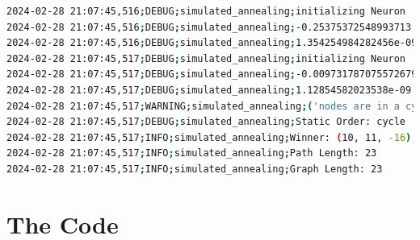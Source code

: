 \documentclass{article}
\begin{document}
\begin{lstlisting}[language=bash, caption=Example Output of Program]
2024-02-28 21:07:45,516;DEBUG;simulated_annealing;initializing Neuron
2024-02-28 21:07:45,516;DEBUG;simulated_annealing;-0.25375372548993713
2024-02-28 21:07:45,516;DEBUG;simulated_annealing;1.354254984282456e-09
2024-02-28 21:07:45,517;DEBUG;simulated_annealing;initializing Neuron
2024-02-28 21:07:45,517;DEBUG;simulated_annealing;-0.009731787075572679
2024-02-28 21:07:45,517;DEBUG;simulated_annealing;1.12854582023538e-09
2024-02-28 21:07:45,517;WARNING;simulated_annealing;('nodes are in a cycle', [(2, 1, -3), err=0.936, (2, 1, -3), err=0.936])
2024-02-28 21:07:45,517;DEBUG;simulated_annealing;Static Order: cycle
2024-02-28 21:07:45,517;INFO;simulated_annealing;Winner: (10, 11, -16), err=0.016
2024-02-28 21:07:45,517;INFO;simulated_annealing;Path Length: 23
2024-02-28 21:07:45,517;INFO;simulated_annealing;Graph Length: 23
\end{lstlisting}

\section{The Code}
\end{document}

